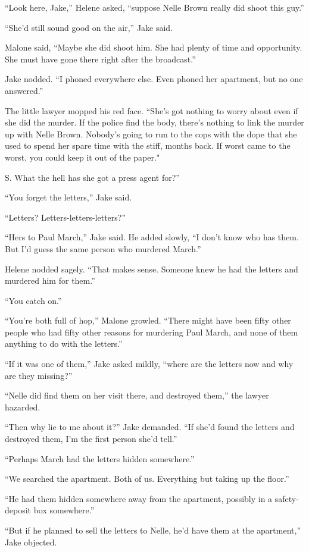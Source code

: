 \documentclass{novel}
\begin{document}
“Look here, Jake,” Helene asked, “suppose Nelle Brown really did shoot this guy.”

“She’d still sound good on the air,” Jake said.

Malone said, “Maybe she did shoot him. She had plenty of time and opportunity. She must have gone there right after the broadcast.”

Jake nodded. “I phoned everywhere else. Even phoned her apartment, but no one answered.”

The little lawyer mopped his red face. “She’s got nothing to worry about even if she did the murder. If the police find the body, there’s nothing to link the murder up with Nelle Brown. Nobody’s going to run to the cops with the dope that she used to spend her spare time with the stiff, months back. If worst came to the worst, you could keep it out of the paper."

S. What the hell has she got a press agent for?”

“You forget the letters,” Jake said.

“Letters? Letters-letters-letters?”

“Hers to Paul March,” Jake said. He added slowly, “I don’t know who has them. But I’d guess the same person who murdered March.”

Helene nodded sagely. “That makes sense. Someone knew he had the letters and murdered him for them.”

“You catch on.”

“You’re both full of hop,” Malone growled. “There might have been fifty other people who had fifty other reasons for murdering Paul March, and none of them anything to do with the letters.”

“If it was one of them,” Jake asked mildly, “where are the letters now and why are they missing?”

“Nelle did find them on her visit there, and destroyed them,” the lawyer hazarded.

“Then why lie to me about it?” Jake demanded. “If she’d found the letters and destroyed them, I’m the first person she’d tell.”

“Perhaps March had the letters hidden somewhere.”

“We searched the apartment. Both of us. Everything but taking up the floor.”

“He had them hidden somewhere away from the apartment, possibly in a safety-deposit box somewhere.”

“But if he planned to sell the letters to Nelle, he’d have them at the apartment,” Jake objected.
\end{document}
